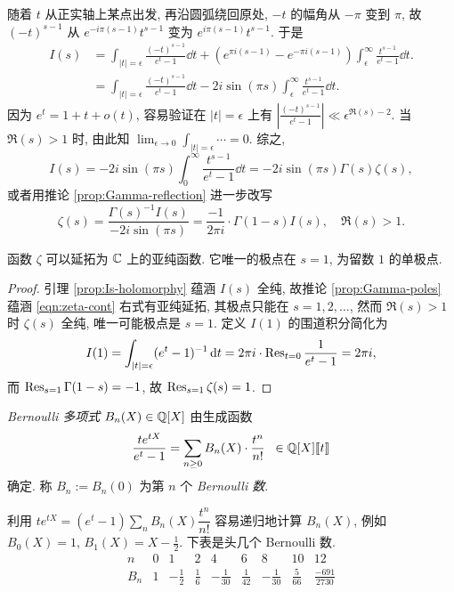 随着 $t$ 从正实轴上某点出发, 再沿圆弧绕回原处, $-t$ 的幅角从 $-\pi$ 变到 $\pi$, 故 $(-t)^{s-1}$ 从 $e^{-i\pi(s-1)} t^{s-1}$ 变为 $e^{i\pi(s-1)} t^{s-1}$. 于是
\begin{align*}
	I(s) & = \int_{|t|=\epsilon} \frac{(-t)^{s-1}}{e^t - 1} \dd t + \left( e^{\pi i(s-1)} - e^{-\pi i(s-1)} \right) \int^\infty_\epsilon \frac{t^{s-1}}{e^t - 1} \dd t. \\
	& = \int_{|t|=\epsilon} \frac{(-t)^{s-1}}{e^t - 1} \dd t - 2i\sin(\pi s) \int^\infty_\epsilon \frac{t^{s-1}}{e^t - 1} \dd t.
\end{align*}
因为 $e^t = 1 + t + o(t)$, 容易验证在 $|t| = \epsilon$ 上有 $\left| \frac{(-t)^{s-1}}{e^t - 1} \right| \ll \epsilon^{\Re(s)-2}$. 当 $\Re(s) > 1$ 时, 由此知 $\displaystyle\lim_{\epsilon \to 0} \int_{|t|=\epsilon} \cdots = 0$. 综之,
\[ I(s) = - 2i\sin(\pi s) \int_0^\infty \frac{t^{s-1}}{e^t - 1} \dd t = -2i \sin(\pi s) \Gamma(s) \zeta(s), \]
或者用推论 \ref{prop:Gamma-reflection} 进一步改写
\begin{equation}\label{eqn:zeta-cont}
	\zeta(s) = \frac{\Gamma(s)^{-1} I(s)}{-2i\sin(\pi s)} = \frac{-1}{2\pi i} \cdot \Gamma(1-s) I(s) , \quad \Re(s) > 1.
\end{equation}

\begin{theorem}
	函数 $\zeta$ 可以延拓为 $\mathbb{C}$ 上的亚纯函数. 它唯一的极点在 $s=1$, 为留数 $1$ 的单极点.
\end{theorem}
\begin{proof}
	引理 \ref{prop:Is-holomorphy} 蕴涵 $I(s)$ 全纯, 故推论 \ref{prop:Gamma-poles} 蕴涵 \eqref{eqn:zeta-cont} 右式有亚纯延拓, 其极点只能在 $s=1, 2, \ldots$, 然而 $\Re(s) > 1$ 时 $\zeta(s)$ 全纯, 唯一可能极点是 $s=1$. 定义 $I(1)$ 的围道积分简化为
	\[ I(1) = \int_{|t|=\epsilon} (e^t - 1)^{-1} \mathop{}\!\mathrm{d} t = 2\pi i \cdot \operatorname{Res}_{t=0} \frac{1}{e^t - 1} = 2\pi i, \]
	而 $\operatorname{Res}_{s=1} \Gamma(1-s) = -1$, 故 $\operatorname{Res}_{s=1} \zeta(s) = 1$.
\end{proof}

\begin{definition}\label{def:Bernoulli}  
	\emph{Bernoulli 多项式} $B_n(X) \in \mathbb{Q}[X]$ 由生成函数
	\[ \frac{t e^{tX}}{e^t - 1} = \sum_{n \geq 0} B_n(X) \cdot \frac{t^n}{n!} \;\; \in \mathbb{Q}[X]\llbracket t \rrbracket \]
	确定. 称 $B_n := B_n(0)$ 为第 $n$ 个 \emph{Bernoulli 数}.
\end{definition}
利用 $t e^{tX} = (e^t - 1) \sum_n B_n(X) \dfrac{t^n}{n!}$ 容易递归地计算 $B_n(X)$, 例如 $B_0(X) = 1$, $B_1(X) = X - \frac{1}{2}$. 下表是头几个 Bernoulli 数.
\begin{equation}\label{eqn:Bernoulli-table} \begin{array}{c|cccccccc}
	n & 0 & 1 & 2 & 4 & 6 & 8 & 10 & 12 \\ \hline
	B_n & 1 & -\frac{1}{2} & \frac{1}{6} & -\frac{1}{30} & \frac{1}{42} & -\frac{1}{30} & \frac{5}{66} & \frac{-691}{2730}
\end{array}\end{equation}

